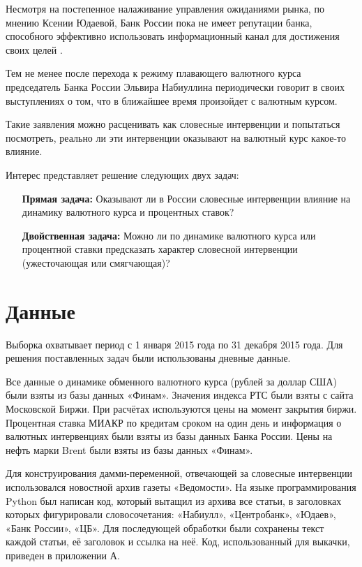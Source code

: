 \documentclass[14pt,a4paper, oneside]{extreport}
\begin{document}
Несмотря на постепенное налаживание управления ожиданиями рынка, по мнению Ксении Юдаевой, Банк России пока не имеет репутации банка, способного эффективно использовать информационный канал для достижения своих целей \cite{UDAEVA}. 

Тем не менее после перехода к режиму плавающего валютного курса председатель Банка России Эльвира Набиуллина периодически говорит в своих выступлениях о том, что в ближайшее время произойдет с валютным курсом. 

Такие заявления можно расценивать как словесные интервенции и попытаться посмотреть, реально ли эти интервенции оказывают на валютный курс какое-то влияние.

Интерес представляет решение следующих двух задач:

\begin{enumerate}

\item[\textbf{Прямая задача:}] Оказывают ли в России словесные интервенции влияние на динамику валютного курса и процентных ставок?

\item[\textbf{Двойственная задача:}] Можно ли по динамике валютного курса или процентной ставки предсказать характер словесной интервенции (ужесточающая или смягчающая)?
\end{enumerate}

\section{Данные}

Выборка охватывает период с 1 января 2015 года по 31 декабря 2015 года. Для решения поставленных задач были использованы дневные данные. 

Все данные о динамике обменного валютного курса (рублей за доллар США)  были взяты из базы данных  «Финам». Значения индекса РТС были взяты с сайта Московской Биржи. При расчётах используются цены на момент закрытия биржи. Процентная ставка МИАКР по кредитам сроком на один день и информация о валютных интервенциях были взяты из базы данных Банка России. Цены на нефть марки Brent были взяты из базы данных «Финам».

Для конструирования дамми-переменной, отвечающей за словесные интервенции использовался новостной архив газеты «Ведомости». На языке программирования Python был написан код, который вытащил из архива все статьи, в заголовках которых фигурировали словосочетания: «Набиулл», «Центробанк», «Юдаев», «Банк России», «ЦБ». Для последующей обработки были сохранены текст каждой статьи, её заголовок и ссылка на неё. Код, использованный для выкачки, приведен в приложении А.  
\end{document}
